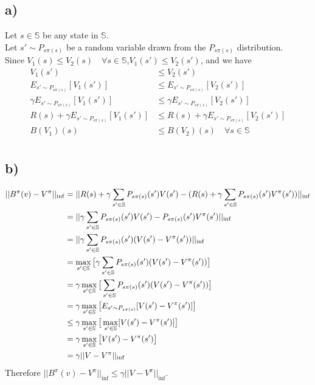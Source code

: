 \documentclass[11pt]{article}
\begin{document}
\subsection*{a)}
Let $s \in \mathbb{S}$ be any state in $\mathbb{S}$.\\
Let $s' \sim P_{s \pi(s)}$ be a random variable drawn from the $P_{s \pi(s)}$ distribution.\\
Since $V_1(s) \le V_2(s) \quad \forall s \in \mathbb{S}$,\quad$V_1(s') \le V_2(s')$, and we have
\begin{align*}
    V_1(s') &\le V_2(s') \\
    E_{s' \sim P_{s \pi(s)}}[V_1(s')] &\le E_{s' \sim P_{s \pi(s)}}[V_2(s')] \\
    \gamma E_{s' \sim P_{s \pi(s)}}[V_1(s')] &\le \gamma E_{s' \sim P_{s \pi(s)}}[V_2(s')] \\
    R(s) + \gamma E_{s' \sim P_{s \pi(s)}}[V_1(s')] &\le R(s) + \gamma E_{s' \sim P_{s \pi(s)}}[V_2(s')] \\
    B(V_1)(s) &\le B(V_2)(s) \quad \forall s \in \mathbb{S} \\
\end{align*}

\subsection*{b)}
\begin{align*}
    ||B^{\pi}(v) - V^{\pi}||_{\inf} &= ||R(s) + \gamma \sum_{s' \in \mathbb{S}} P_{s \pi(s)}(s') V(s') - (R(s) + \gamma \sum_{s' \in \mathbb{S}} P_{s \pi(s)}(s') V^{\pi}(s')) ||_{\inf} \\
                                    &= ||\gamma \sum_{s' \in \mathbb{S}} P_{s \pi(s)}(s') V(s') - P_{s \pi(s)}(s') V^{\pi}(s') ||_{\inf} \\
                                    &= ||\gamma \sum_{s' \in \mathbb{S}} P_{s \pi(s)}(s') (V(s') - V^{\pi}(s')) ||_{\inf} \\
                                    &= \max_{s' \in \mathbb{S}} \big[ \gamma \sum_{s' \in \mathbb{S}} P_{s \pi(s)}(s') (V(s') - V^{\pi}(s')) \big] \\
                                    &= \gamma \max_{s' \in \mathbb{S}} \big[ \sum_{s' \in \mathbb{S}} P_{s \pi(s)}(s') (V(s') - V^{\pi}(s')) \big] \\
                                    &= \gamma \max_{s' \in \mathbb{S}} \big[ E_{s' \sim P_{s \pi(s)}}[V(s') - V^{\pi}(s')] \big] \\
                                    &\le \gamma \max_{s' \in \mathbb{S}} \big[ \max_{s' \in \mathbb{S}}[V(s') - V^{\pi}(s')] \big] \\
                                    &= \gamma \max_{s' \in \mathbb{S}} \big[ V(s') - V^{\pi}(s') \big] \\
                                    &= \gamma || V - V^{\pi} ||_{\inf} \\
\end{align*}
Therefore $||B^{\pi}(v) - V^{\pi}||_{\inf} \le \gamma || V - V^{\pi} ||_{\inf}$. \\
\end{document}
